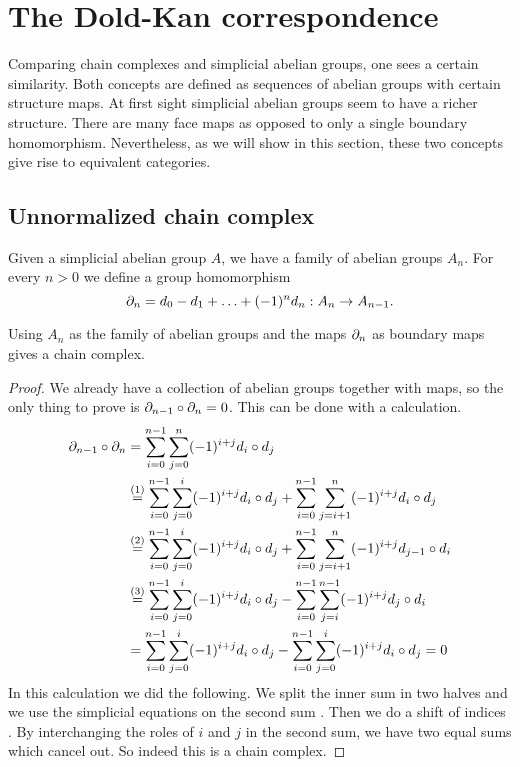 \section{The Dold-Kan correspondence}
\label{sec:Constructions}

Comparing chain complexes and simplicial abelian groups, one sees a certain similarity. Both concepts are defined as sequences of abelian groups with certain structure maps. At first sight simplicial abelian groups seem to have a richer structure. There are many face maps as opposed to only a single boundary homomorphism. Nevertheless, as we will show in this section, these two concepts give rise to equivalent categories.

\subsection{Unnormalized chain complex}
Given a simplicial abelian group $A$, we have a family of abelian groups $A_n$. For every $n>0$ we define a group homomorphism
$$\partial_n = d_0 - d_1 + \ldots + (-1)^n d_n: A_n \to A_{n-1}.$$
\begin{lemma}
	Using $A_n$ as the family of abelian groups and the maps $\partial_n$ as boundary maps gives a chain complex.
\end{lemma}
\begin{proof}
	We already have a collection of abelian groups together with maps, so the only thing to prove is $\partial_{n-1} \circ \partial_n = 0$. This can be done with a calculation.
	\begin{align*}
		\partial_{n-1} \circ \partial_n &= \sum_{i=0}^{n-1}  \sum_{j=0}^{n} (-1)^{i+j} d_i \circ d_j \\
			&\stackrel{(1)}{=} \sum_{i=0}^{n-1} \sum_{j=0}^{i} (-1)^{i+j} d_i \circ d_j + \sum_{i=0}^{n-1} \sum_{j=i+1}^{n} (-1)^{i+j} d_i \circ d_j \\
			&\stackrel{(2)}{=} \sum_{i=0}^{n-1} \sum_{j=0}^{i} (-1)^{i+j} d_i \circ d_j + \sum_{i=0}^{n-1} \sum_{j=i+1}^{n} (-1)^{i+j} d_{j-1} \circ d_i \\
			&\stackrel{(3)}{=} \sum_{i=0}^{n-1} \sum_{j=0}^{i} (-1)^{i+j} d_i \circ d_j - \sum_{i=0}^{n-1} \sum_{j=i}^{n-1} (-1)^{i+j} d_j \circ d_i \\
			&= \sum_{i=0}^{n-1} \sum_{j=0}^{i} (-1)^{i+j} d_i \circ d_j - \sum_{i=0}^{n-1} \sum_{j=0}^{i} (-1)^{i+j} d_i \circ d_j = 0
	\end{align*}
	In this calculation we did the following. We split the inner sum in two halves  and we use the simplicial equations on the second sum . Then we do a shift of indices . By interchanging the roles of $i$ and $j$ in the second sum, we have two equal sums which cancel out. So indeed this is a chain complex.
\end{proof}

